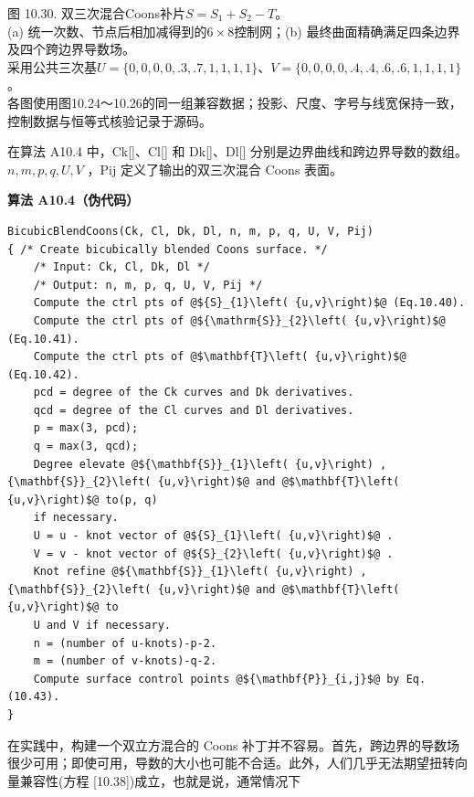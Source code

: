 \documentclass[../main.tex]{subfiles}
\begin{document}
\begin{center}
\begin{minipage}{37cm}
\vspace*{.6\baselineskip}
\centering
{}
\par\smallskip
图 10.30. 双三次混合Coons补片$S=S_1+S_2-T$。\\
(a) 统一次数、节点后相加减得到的$6\times8$控制网；(b) 最终曲面精确满足四条边界及四个跨边界导数场。\\
采用公共三次基$U=\{0,0,0,0,.3,.7,1,1,1,1\}$、$V=\{0,0,0,0,.4,.4,.6,.6,1,1,1,1\}$。\\
各图使用图10.24～10.26的同一组兼容数据；投影、尺度、字号与线宽保持一致，控制数据与恒等式核验记录于源码。
\end{minipage}
\end{center}

在算法 A10.4 中，Ck[]、Cl[] 和 Dk[]、Dl[] 分别是边界曲线和跨边界导数的数组。 \(n,m,p,q,U,V\) ，Pij 定义了输出的双三次混合 Coons 表面。

\par\medskip\noindent\textbf{算法 A10.4（伪代码）}\par
\begin{verbatim}
BicubicBlendCoons(Ck, Cl, Dk, Dl, n, m, p, q, U, V, Pij)
{ /* Create bicubically blended Coons surface. */
    /* Input: Ck, Cl, Dk, Dl */
    /* Output: n, m, p, q, U, V, Pij */
    Compute the ctrl pts of @${S}_{1}\left( {u,v}\right)$@ (Eq.10.40).
    Compute the ctrl pts of @${\mathrm{S}}_{2}\left( {u,v}\right)$@ (Eq.10.41).
    Compute the ctrl pts of @$\mathbf{T}\left( {u,v}\right)$@ (Eq.10.42).
    pcd = degree of the Ck curves and Dk derivatives.
    qcd = degree of the Cl curves and Dl derivatives.
    p = max(3, pcd);
    q = max(3, qcd);
    Degree elevate @${\mathbf{S}}_{1}\left( {u,v}\right) ,{\mathbf{S}}_{2}\left( {u,v}\right)$@ and @$\mathbf{T}\left( {u,v}\right)$@ to(p, q)
    if necessary.
    U = u - knot vector of @${S}_{1}\left( {u,v}\right)$@ .
    V = v - knot vector of @${S}_{2}\left( {u,v}\right)$@ .
    Knot refine @${\mathbf{S}}_{1}\left( {u,v}\right) ,{\mathbf{S}}_{2}\left( {u,v}\right)$@ and @$\mathbf{T}\left( {u,v}\right)$@ to
    U and V if necessary.
    n = (number of u-knots)-p-2.
    m = (number of v-knots)-q-2.
    Compute surface control points @${\mathbf{P}}_{i,j}$@ by Eq. (10.43).
}
\end{verbatim}

在实践中，构建一个双立方混合的 Coons 补丁并不容易。首先，跨边界的导数场很少可用；即使可用，导数的大小也可能不合适。此外，人们几乎无法期望扭转向量兼容性(方程 [10.38])成立，也就是说，通常情况下
\end{document}
